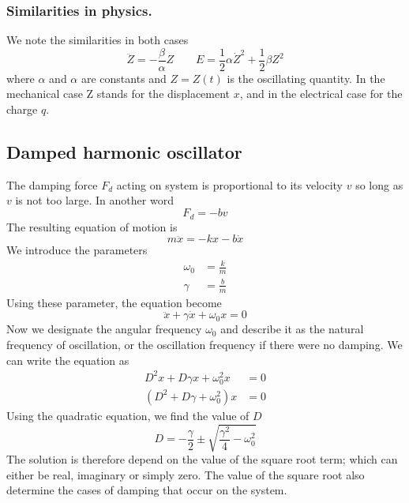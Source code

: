 \documentclass[../main.tex]{subfiles}
\begin{document}
\subsubsection*{Similarities in physics.} We note the similarities in both cases 
\begin{equation*}
    \ddot{Z}=-\frac{\beta}{\alpha}Z\qquad E=\frac{1}{2}\alpha\dot{Z}^2+\frac{1}{2}\beta Z^2
\end{equation*}
where $\alpha$ and $\alpha$ are constants and $Z = Z(t)$ is the oscillating quantity. In the mechanical case Z stands for the displacement $x$, and in the electrical case for the charge $q$.

\subsection*{Damped harmonic oscillator} 
The damping force $F_d$ acting on system is proportional to its velocity $v$ so long as $v$ is not too large. In another word
\begin{equation*}
    F_d=-bv
\end{equation*}
The resulting equation of motion is
\begin{equation*}
    m\ddot{x}=-kx-b\dot{x}
\end{equation*}
We introduce the parameters
\begin{align*}
    \omega_0&=\frac{k}{m}\\
    \gamma&=\frac{b}{m}
\end{align*}
Using these parameter, the equation become
\begin{equation*}
    \ddot{x}+\gamma\dot{x}+\omega_0 x=0
\end{equation*}
Now we designate the angular frequency $\omega_0$ and describe it as the natural frequency of oscillation, or the oscillation frequency if there were no damping. We can write the equation as\begin{align*}
    D^2x+D\gamma x+\omega_0^2x&=0\\
    (D^2+D\gamma +\omega_0^2)x&=0
\end{align*}
Using the quadratic equation, we find the value of $D$
\begin{equation*}
    D=-\frac{\gamma}{2}\pm \sqrt{\frac{\gamma^2}{4}-\omega_0^2}
\end{equation*}
The solution is therefore depend on the value of the square root term; which can either be real, imaginary or simply zero. The value of the square root also determine the cases of damping that occur on the system. 
\end{document}

